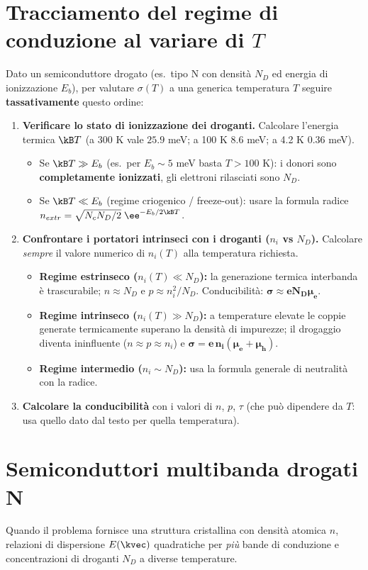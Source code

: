 \section{Tracciamento del regime di conduzione al variare di $T$}
Dato un semiconduttore drogato (es.\ tipo N con densità $N_D$ ed energia di ionizzazione $E_b$), per valutare $\sigma(T)$ a una generica temperatura $T$ seguire \textbf{tassativamente} questo ordine:
\begin{enumerate}
    \setlength{\itemsep}{2pt}
    \item \textbf{Verificare lo stato di ionizzazione dei droganti.} Calcolare l'energia termica $\kB T$ (a 300 K vale $25.9$ meV; a 100 K $8.6$ meV; a 4.2 K $0.36$ meV).
    \begin{itemize}
        \item Se $\kB T\gg E_b$ (es.\ per $E_b\sim5$ meV basta $T>100$ K): i donori sono \textbf{completamente ionizzati}, gli elettroni rilasciati sono $N_D$.
        \item Se $\kB T\ll E_b$ (regime criogenico / freeze-out): usare la formula radice $n_{extr}=\sqrt{N_cN_D/2}\;\ee^{-E_b/2\kB T}$.
    \end{itemize}
    \item \textbf{Confrontare i portatori intrinseci con i droganti ($n_i$ vs $N_D$).} Calcolare \emph{sempre} il valore numerico di $n_i(T)$ alla temperatura richiesta.
    \begin{itemize}
        \item \textbf{Regime estrinseco ($n_i(T)\ll N_D$):} la generazione termica interbanda è trascurabile; $n\approx N_D$ e $p\approx n_i^2/N_D$. Conducibilità: $\bm{\sigma\approx eN_D\mu_e}$.
        \item \textbf{Regime intrinseco ($n_i(T)\gg N_D$):} a temperature elevate le coppie generate termicamente superano la densità di impurezze; il drogaggio diventa ininfluente ($n\approx p\approx n_i$) e $\bm{\sigma = e\,n_i(\mu_e+\mu_h)}$.
        \item \textbf{Regime intermedio ($n_i \sim N_D$):} usa la formula generale di neutralità con la radice.
    \end{itemize}
    \item \textbf{Calcolare la conducibilità} con i valori di $n$, $p$, $\tau$ (che può dipendere da $T$: usa quello dato dal testo per quella temperatura).
\end{enumerate}

\section{Semiconduttori multibanda drogati N}
Quando il problema fornisce una struttura cristallina con densità atomica $n$, relazioni di dispersione $E(\kvec)$ quadratiche per \emph{più} bande di conduzione e concentrazioni di droganti $N_D$ a diverse temperature.

